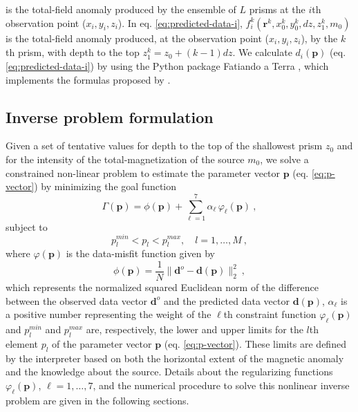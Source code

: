 is the total-field anomaly produced by the ensemble of $L$ prisms at the $i$th observation point ($x_{i}, y_{i}, z_{i}$). 
In eq. \ref{eq:predicted-data-i}, $f_{i}^{k}(\mathbf{r}^{k}, x_{0}^{k}, y_{0}^{k}, dz, z_{1}^{k}, m_{0})$ is the total-field anomaly 
produced, at the observation point ($x_{i}, y_{i}, z_{i}$), by the $k$th prism, with depth to the top $z_{1}^{k} = z_{0} + (k-1)dz$.
We calculate $d_{i} (\mathbf{p})$ (eq. \ref{eq:predicted-data-i}) by using the Python package Fatiando a Terra \citep{uieda-etal2013}, 
which implements the formulas proposed by \cite{plouff1976}.

\subsection{Inverse problem formulation}

Given a set of tentative values for depth to the top of the shallowest prism $z_{0}$ and for the intensity of the 
total-magnetization of the source $m_{0}$, we solve a constrained non-linear problem to estimate the parameter 
vector $\mathbf{p}$ (eq. \ref{eq:p-vector}) by minimizing the goal function
\begin{equation}
\Gamma (\mathbf{p}) = \phi (\mathbf{p}) + \sum\limits^{7}_{\ell =1} \alpha_{\ell} \, \varphi_{\ell}(\mathbf{p}) \: ,
\label{eq:gamma}
\end{equation}
subject to
\begin{equation}
p_{l}^{min} < p_{l} < p_{l}^{max}, \quad l = 1, \dots, M \: ,
\label{eq:inequality-constraint}
\end{equation}
where $\varphi (\mathbf{p})$ is the data-misfit function given by
\begin{equation}\label{eq:misfit}
\phi (\mathbf{p}) = \frac{1}{N} \| \mathbf{d}^{o} - \mathbf{d}(\mathbf{p}) \|_{2}^{2} \: ,
\end{equation}
which represents the normalized squared Euclidean norm of the difference between the observed data vector $\mathbf{d}^{o}$ and 
the predicted data vector $\mathbf{d}(\mathbf{p})$, $\alpha_{\ell}$ is a positive number representing the weight of the 
$\ell$th constraint function $\varphi_{\ell}(\mathbf{p})$ and $p_{l}^{min}$ and $p_{l}^{max}$ are, respectively, the lower and 
upper limits for the $l$th element $p_{l}$ of the parameter vector $\mathbf{p}$ (eq. \ref{eq:p-vector}). 
These limits are defined by the interpreter based on both the horizontal extent of the magnetic anomaly and the knowledge 
about the source. Details about the regularizing functions $\varphi_\ell(\mathbf{p})$, $\ell = 1, \dots, 7$, and the numerical procedure to solve this nonlinear inverse problem are given in the following sections.

